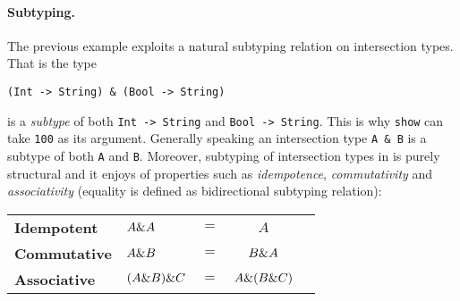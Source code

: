 




\paragraph{Subtyping.} The previous example exploits a natural
subtyping relation on intersection types. That is the type

\begin{lstlisting}
(Int -> String) & (Bool -> String)
\end{lstlisting}

\noindent is a \emph{subtype} of both \lstinline{Int -> String} and
\lstinline{Bool -> String}. This is why \lstinline{show} can take
\lstinline{100} as its argument. Generally speaking an intersection type
\lstinline{A & B} is a subtype of both \lstinline{A} and \lstinline{B}.
Moreover, subtyping of intersection types in \name is purely structural
and it enjoys of properties such as \emph{idempotence},
\emph{commutativity} and \emph{associativity}
(equality is defined as bidirectional subtyping relation): \\


\begin{tabular}{llrcl}
  \textbf{Idempotent}  & $A \& A$            & $=$ & $A$ \\
  \textbf{Commutative} & $A \& B$            & $=$ & $B \& A$ \\
  \textbf{Associative} & $(A \& B) \& C$ & $=$ & $A \& (B \& C)$
\end{tabular}


